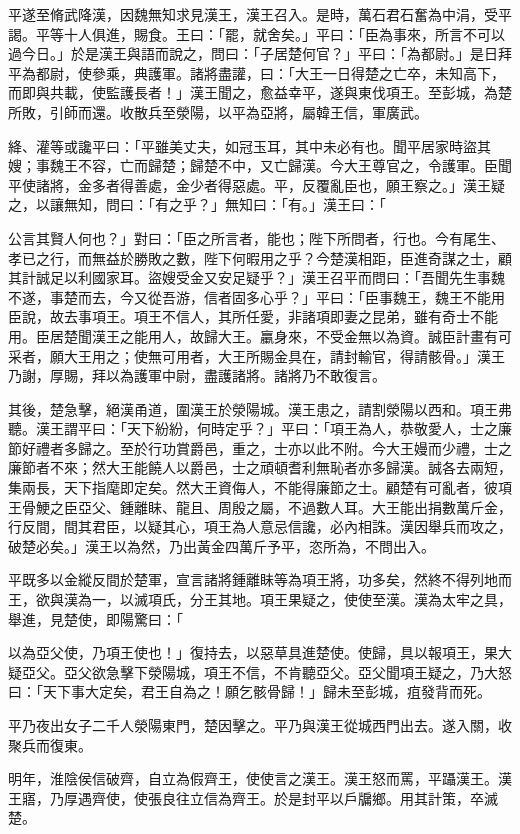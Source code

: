 \begin{pinyinscope}
平遂至脩武降漢，因魏無知求見漢王，漢王召入。是時，萬石君石奮為中涓，受平謁。平等十人俱進，賜食。王曰：「罷，就舍矣。」平曰：「臣為事來，所言不可以過今日。」於是漢王與語而說之，問曰：「子居楚何官？」平曰：「為都尉。」是日拜平為都尉，使參乘，典護軍。諸將盡讙，曰：「大王一日得楚之亡卒，未知高下，而即與共載，使監護長者！」漢王聞之，愈益幸平，遂與東伐項王。至彭城，為楚所敗，引師而還。收散兵至滎陽，以平為亞將，屬韓王信，軍廣武。

絳、灌等或讒平曰：「平雖美丈夫，如冠玉耳，其中未必有也。聞平居家時盜其嫂；事魏王不容，亡而歸楚；歸楚不中，又亡歸漢。今大王尊官之，令護軍。臣聞平使諸將，金多者得善處，金少者得惡處。平，反覆亂臣也，願王察之。」漢王疑之，以讓無知，問曰：「有之乎？」無知曰：「有。」漢王曰：「

公言其賢人何也？」對曰：「臣之所言者，能也；陛下所問者，行也。今有尾生、孝已之行，而無益於勝敗之數，陛下何暇用之乎？今楚漢相距，臣進奇謀之士，顧其計誠足以利國家耳。盜嫂受金又安足疑乎？」漢王召平而問曰：「吾聞先生事魏不遂，事楚而去，今又從吾游，信者固多心乎？」平曰：「臣事魏王，魏王不能用臣說，故去事項王。項王不信人，其所任愛，非諸項即妻之昆弟，雖有奇士不能用。臣居楚聞漢王之能用人，故歸大王。臝身來，不受金無以為資。誠臣計畫有可采者，願大王用之；使無可用者，大王所賜金具在，請封輸官，得請骸骨。」漢王乃謝，厚賜，拜以為護軍中尉，盡護諸將。諸將乃不敢復言。

其後，楚急擊，絕漢甬道，圍漢王於滎陽城。漢王患之，請割滎陽以西和。項王弗聽。漢王謂平曰：「天下紛紛，何時定乎？」平曰：「項王為人，恭敬愛人，士之廉節好禮者多歸之。至於行功賞爵邑，重之，士亦以此不附。今大王嫚而少禮，士之廉節者不來；然大王能饒人以爵邑，士之頑頓耆利無恥者亦多歸漢。誠各去兩短，集兩長，天下指麾即定矣。然大王資侮人，不能得廉節之士。顧楚有可亂者，彼項王骨鯁之臣亞父、鍾離眛、龍且、周殷之屬，不過數人耳。大王能出捐數萬斤金，行反間，間其君臣，以疑其心，項王為人意忌信讒，必內相誅。漢因舉兵而攻之，破楚必矣。」漢王以為然，乃出黃金四萬斤予平，恣所為，不問出入。

平既多以金縱反間於楚軍，宣言諸將鍾離眛等為項王將，功多矣，然終不得列地而王，欲與漢為一，以滅項氏，分王其地。項王果疑之，使使至漢。漢為太牢之具，舉進，見楚使，即陽驚曰：「

以為亞父使，乃項王使也！」復持去，以惡草具進楚使。使歸，具以報項王，果大疑亞父。亞父欲急擊下滎陽城，項王不信，不肯聽亞父。亞父聞項王疑之，乃大怒曰：「天下事大定矣，君王自為之！願乞骸骨歸！」歸未至彭城，疽發背而死。

平乃夜出女子二千人滎陽東門，楚因擊之。平乃與漢王從城西門出去。遂入關，收聚兵而復東。

明年，淮陰侯信破齊，自立為假齊王，使使言之漢王。漢王怒而罵，平躡漢王。漢王寤，乃厚遇齊使，使張良往立信為齊王。於是封平以戶牖鄉。用其計策，卒滅楚。


\end{pinyinscope}

